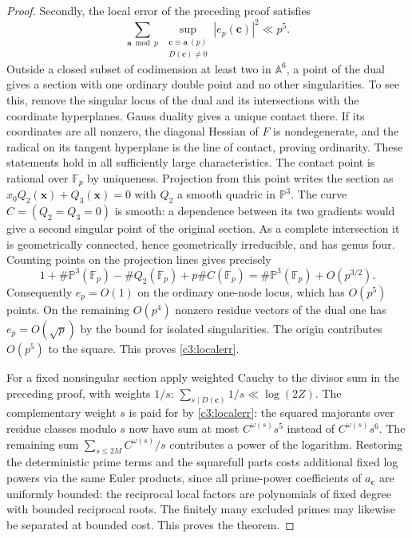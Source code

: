 \documentclass[11pt,letterpaper]{article}
\theoremstyle{definition}
\begin{document}
\begin{proof}
Secondly, the local error of the preceding proof satisfies
\begin{equation}\label{c3:localerr}
  \sum_{\mathbf a\bmod p}\ 
     \sup_{\substack{\mathbf c\equiv\mathbf a\ (p)\\D(\mathbf c)\ne0}}
           |e_p(\mathbf c)|^2 \ll p^5 .
\end{equation}
Outside a closed subset of codimension at least two in
$\mathbb A^6$, a point of the dual gives a section with one ordinary
double point and no other singularities. To see this, remove the
singular locus of the dual and its intersections with the coordinate
hyperplanes. Gauss duality gives a unique contact there. If its
coordinates are all nonzero, the diagonal Hessian of $F$ is
nondegenerate, and the radical on its tangent hyperplane is the
line of contact, proving ordinarity. These statements hold in all
sufficiently large characteristics. The contact point is rational
over $\mathbb F_p$ by uniqueness. Projection from this point
writes the section as $x_0 Q_2(\mathbf x)+Q_3(\mathbf x)=0$ with
$Q_2$ a smooth quadric in $\mathbb P^3$. The curve $C=(Q_2=Q_3=0)$
is smooth: a dependence between its two gradients would give a
second singular point of the original section. As a complete
intersection it is geometrically connected, hence geometrically
irreducible, and has genus four. Counting points on the projection
lines gives precisely
\[
 1+\#\mathbb P^3(\mathbb F_p)-\#Q_2(\mathbb F_p)
       +p\#C(\mathbb F_p)=\#\mathbb P^3(\mathbb F_p)+O(p^{3/2}).
\]
Consequently $e_p=O(1)$ on the ordinary one-node locus, which has
$O(p^5)$ points. On the remaining $O(p^4)$ nonzero residue vectors
of the dual one has $e_p=O(\sqrt p)$ by the bound for isolated
singularities. The origin contributes $O(p^5)$ to the square.
This proves \eqref{c3:localerr}.

For a fixed nonsingular section apply weighted Cauchy to the divisor
sum in the preceding proof, with weights $1/s$:
$\sum_{s\mid D(\mathbf c)}1/s\ll\log(2Z)$. The complementary
weight $s$ is paid for by \eqref{c3:localerr}: the squared
majorants over residue classes modulo $s$ now have sum at most
$C^{\omega(s)}s^5$ instead of $C^{\omega(s)}s^6$. The remaining
sum $\sum_{s\le2M}C^{\omega(s)}/s$ contributes a power of the
logarithm. Restoring the deterministic prime terms and the
squarefull parts costs additional fixed log powers via the same
Euler products, since all prime-power coefficients of
$a_{\mathbf c}$ are uniformly bounded: the reciprocal local
factors are polynomials of fixed degree with bounded reciprocal
roots. The finitely many excluded primes may likewise be separated
at bounded cost. This proves the theorem.
\end{proof}
\end{document}

